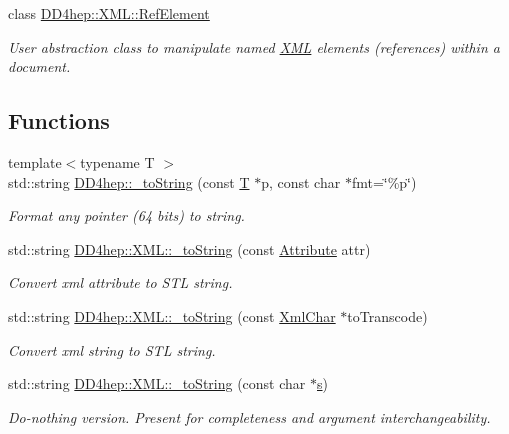 \begin{DoxyCompactItemize}
class \hyperlink{class_d_d4hep_1_1_x_m_l_1_1_ref_element}{D\+D4hep\+::\+X\+M\+L\+::\+Ref\+Element}
\begin{DoxyCompactList}\small\item\em User abstraction class to manipulate named \hyperlink{namespace_d_d4hep_1_1_x_m_l}{X\+ML} elements (references) within a document. \end{DoxyCompactList}\end{DoxyCompactItemize}
\subsection*{Functions}
\begin{DoxyCompactItemize}
\item 
{\footnotesize template$<$typename T $>$ }\\std\+::string \hyperlink{group___d_d4_h_e_p___x_m_l_ga9f9a53baefc2d21a7276090d8b988d29}{D\+D4hep\+::\+\_\+to\+String} (const \hyperlink{class_t}{T} $\ast$p, const char $\ast$fmt=\char`\"{}\%p\char`\"{})
\begin{DoxyCompactList}\small\item\em Format any pointer (64 bits) to string. \end{DoxyCompactList}\item 
std\+::string \hyperlink{group___d_d4_h_e_p___x_m_l_gad2124529d3b80b7896b4d5a370ee906e}{D\+D4hep\+::\+X\+M\+L\+::\+\_\+to\+String} (const \hyperlink{namespace_d_d4hep_1_1_x_m_l_a5c19b7116be99d69b4b22d911357baaf}{Attribute} attr)
\begin{DoxyCompactList}\small\item\em Convert xml attribute to S\+TL string. \end{DoxyCompactList}\item 
std\+::string \hyperlink{group___d_d4_h_e_p___x_m_l_ga4c56544a190950d18779b16e986783ab}{D\+D4hep\+::\+X\+M\+L\+::\+\_\+to\+String} (const \hyperlink{namespace_d_d4hep_1_1_x_m_l_a09e5d9cc86ed782f6826dfe0778c1815}{Xml\+Char} $\ast$to\+Transcode)
\begin{DoxyCompactList}\small\item\em Convert xml string to S\+TL string. \end{DoxyCompactList}\item 
std\+::string \hyperlink{group___d_d4_h_e_p___x_m_l_ga7a1c3ef4f1a036d3ccccfd9fff8cd30f}{D\+D4hep\+::\+X\+M\+L\+::\+\_\+to\+String} (const char $\ast$\hyperlink{_volumes_8cpp_a17ca6bfc8040d695d3cada22a4763d40}{s})
\begin{DoxyCompactList}\small\item\em Do-\/nothing version. Present for completeness and argument interchangeability. \end{DoxyCompactList}\item 

\end{DoxyCompactItemize}
